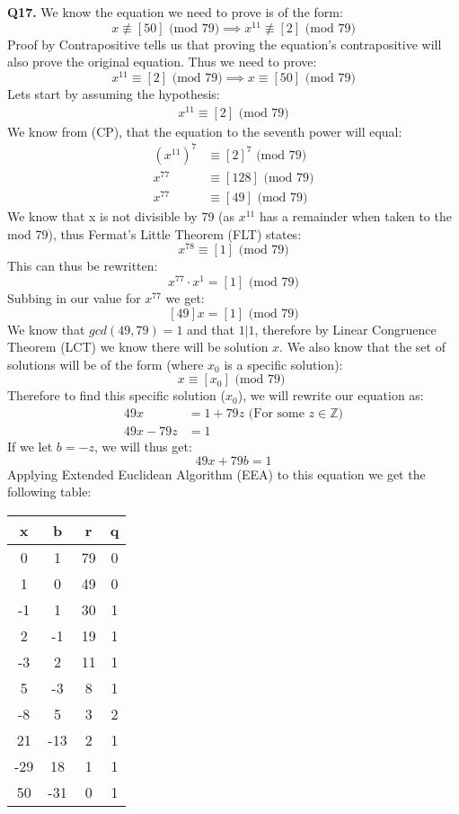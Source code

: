 \documentclass[11pt]{article}
\begin{document}
\parindent=0pt

\textbf{Q17.} We know the equation we need to prove is of the form:
\[ x \not\equiv [50] \text{ (mod 79)} \implies x^{11} \not\equiv [2] \text{ (mod 79)} \]
Proof by Contrapositive tells us that proving the equation's contrapositive will also prove the original equation. Thus we need to prove:
\[ x^{11} \equiv [2] \text{ (mod 79)}  \implies x \equiv [50] \text{ (mod 79)} \]
Lets start by assuming the hypothesis:
\begin{align*}
 x^{11} \equiv [2] \text{ (mod 79)} 
\end{align*}
We know from (CP), that the equation to the seventh power will equal:
\begin{align*}
 (x^{11})^7 &\equiv [2]^7 \text{ (mod 79)} \\
 x^{77} &\equiv [128] \text{ (mod 79)} \\
 x^{77} &\equiv [49] \text{ (mod 79)} 
\end{align*}
We know that x is not divisible by 79 (as $x^{11}$ has a remainder when taken to the mod 79), thus Fermat's Little Theorem (FLT) states: 
\[ x^{78} \equiv [1] \text{ (mod 79)} \] 
This can thus be rewritten:
\[ x^{77}\cdot x^1 = [1] \text{ (mod 79)} \]
Subbing in our value for $x^{77}$ we get:
\[ [49]x = [1] \text{ (mod 79)} \]
We know that $gcd(49,79) = 1$ and that $1|1$, therefore by Linear Congruence Theorem (LCT) we know there will be solution $x$. We also know that the set of solutions will be of the form (where $x_0$ is a specific solution):
\[ x \equiv [x_0] \text{ (mod 79) } \]
Therefore to find this specific solution ($x_0$), we will rewrite our equation as: 
\begin{align*}
 49x & = 1 + 79z \text{ (For some $z \in \mathbb{Z}$)}  \\
 49x - 79z  &= 1 
\end{align*}
If we let $b = -z$, we will thus get:
\[  49x + 79b  = 1 \]
Applying Extended Euclidean Algorithm (EEA) to this equation we get the following table:
\begin{center}
 \begin{tabular}{||c c c c||} 
 \hline
 x & b & r & q \\ [0.5ex] 
 \hline\hline
 0 & 1 & 79 & 0 \\ 
 \hline
 1 & 0 & 49 & 0 \\
 \hline
 -1 & 1 & 30 & 1 \\
 \hline
 2 & -1 & 19 & 1\\
 \hline
 -3 & 2 & 11 & 1\\ 
 \hline
 5 & -3  & 8 & 1 \\
 \hline
 -8 & 5 & 3 & 2 \\ 
 \hline
21 & -13 & 2 & 1\\ 
 \hline
-29 & 18 & 1 & 1\\ 
 \hline
50 & -31 & 0 & 1\\ 
 \hline
\end{tabular}
\end{center}
\end{document}
